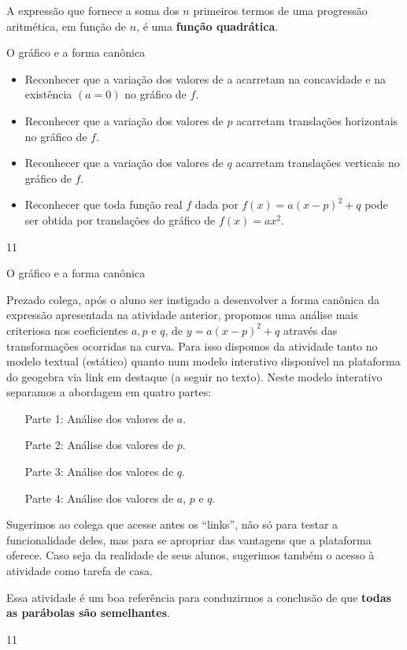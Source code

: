 \begin{observation}

A expressão que fornece a soma dos \(n\) primeiros termos de uma progressão aritmética, em função de \(n\), é uma \textbf{função quadrática}.
\end{observation}

\cleardoublepage
\def\currentcolor{session1}
\begin{objectives}{O gráfico e a forma canônica}
{
\begin{itemize}
\item Reconhecer que a variação dos valores de a acarretam na concavidade e na existência $(a=0)$ no gráfico de $f$.
\item Reconhecer que a variação dos valores de $p$ acarretam translações horizontais no gráfico de $f$.
\item Reconhecer que a variação dos valores de $q$ acarretam translações verticais no gráfico de $f$.
\item Reconhecer que toda função real $f$ dada por $f(x)=a(x−p)^2+q$ pode ser obtida por translações do gráfico de $f(x)=ax^2$.
\end{itemize}
}{1}{1}
\end{objectives}
\begin{sugestions}{O gráfico e a forma canônica}
{
Prezado colega, após o aluno ser instigado a desenvolver a forma canônica da expressão apresentada na atividade anterior, propomos uma análise mais criteriosa nos coeficientes $a, p$ e $q$, de $y=a(x−p)^2+q$ através das transformações ocorridas na curva. Para isso dispomos da atividade tanto no modelo textual (estático) quanto num modelo interativo disponível na plataforma do geogebra via link em destaque (a seguir no texto). Neste modelo interativo separamos a abordagem em quatro partes:

\begin{itemize}
\item[Parte 1:] Análise dos valores de $a$.
\item[Parte 2:] Análise dos valores de $p$.
\item[Parte 3:] Análise dos valores de $q$.
\item[Parte 4:] Análise dos valores de $a$, $p$ e $q$.
\end{itemize}

Sugerimos ao colega que acesse antes os “links”, não só para testar a funcionalidade deles, mas para se apropriar das vantagens que a plataforma oferece. Caso seja da realidade de seus alunos, sugerimos também o acesso à atividade como tarefa de casa.

Essa atividade é um boa referência para conduzirmos a conclusão de que \textbf{todas as parábolas são semelhantes}.
}{1}{1}
\end{sugestions}
